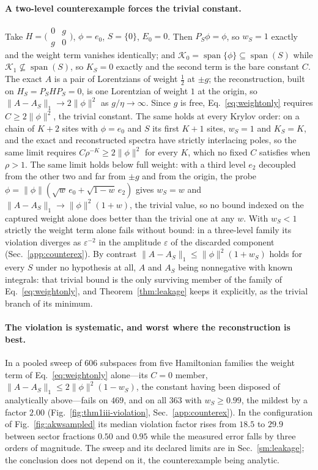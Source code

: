\paragraph{A two-level counterexample forces the trivial constant.}
Take $H=\big(\begin{smallmatrix}0&g\\ g&0\end{smallmatrix}\big)$, $\phi=e_0$, $S=\{0\}$, $E_0=0$. Then
$P_S\phi=\phi$, so $w_S=1$ exactly and the weight term vanishes identically; and
$\mathcal K_0=\operatorname{span}\{\phi\}\subseteq\operatorname{span}(S)$ while
$\mathcal K_1\not\subseteq\operatorname{span}(S)$, so $K_S=0$ exactly and the second term is the bare
constant $C$. The exact $A$ is a pair of Lorentzians of weight $\tfrac12$ at $\pm g$; the
reconstruction, built on $H_S=P_SHP_S=0$, is one Lorentzian of weight $1$ at the origin, so
$\lVert A-A_S\rVert_{1}\to2\lVert\phi\rVert^{2}$ as $g/\eta\to\infty$. Since $g$ is free,
Eq.~\eqref{eq:weightonly} requires $C\ge2\lVert\phi\rVert^{2}$, the trivial constant. The same holds at every Krylov order: on a chain of $K+2$ sites with $\phi=e_0$ and $S$ its first $K+1$ sites, $w_S=1$ and $K_S=K$, and the exact and reconstructed spectra have strictly interlacing poles, so the same limit requires $C\rho^{-K}\ge2\lVert\phi\rVert^{2}$ for every $K$, which no fixed $C$ satisfies when $\rho>1$. The same limit holds below full weight: with a third level $e_2$ decoupled from the other two and far from $\pm g$ and from the origin, the probe $\phi=\lVert\phi\rVert(\sqrt{w}\,e_0+\sqrt{1-w}\,e_2)$ gives $w_S=w$ and $\lVert A-A_S\rVert_{1}\to\lVert\phi\rVert^{2}(1+w)$, the trivial value, so no bound indexed on the captured weight alone does better than the trivial one at any $w$. With $w_S<1$ strictly the weight term alone fails without bound: in a three-level family its violation diverges as $\varepsilon^{-2}$ in the amplitude $\varepsilon$ of the discarded component (Sec.~\ref{app:counterex}). By contrast
$\lVert A-A_S\rVert_{1}\le\lVert\phi\rVert^{2}(1+w_S)$ holds for every $S$ under no hypothesis at all,
$A$ and $A_S$ being nonnegative with known integrals: that trivial bound is the only surviving member of
the family of Eq.~\eqref{eq:weightonly}, and Theorem~\ref{thm:leakage} keeps it explicitly, as the trivial branch
of its minimum.
\paragraph{The violation is systematic, and worst where the reconstruction is best.} In a pooled sweep
of $606$ subspaces from five Hamiltonian families the weight term of Eq.~\eqref{eq:weightonly}
alone---its $C=0$ member, $\lVert A-A_S\rVert_{1}\le2\lVert\phi\rVert^{2}(1-w_S)$, the constant having
been disposed of analytically above---fails on $469$, and on all $363$
with $w_S\ge0.99$, the mildest by a factor $2.00$ (Fig.~\ref{fig:thm1iii-violation},
Sec.~\ref{app:counterex}). In the
configuration of Fig.~\ref{fig:akwsampled} its median violation factor rises from $18.5$ to $29.9$
between sector fractions $0.50$ and $0.95$ while the measured error falls by three orders of magnitude.
The sweep and its declared limits are in Sec.~\ref{sm:leakage}; the conclusion does not depend on it,
the counterexample being analytic.

